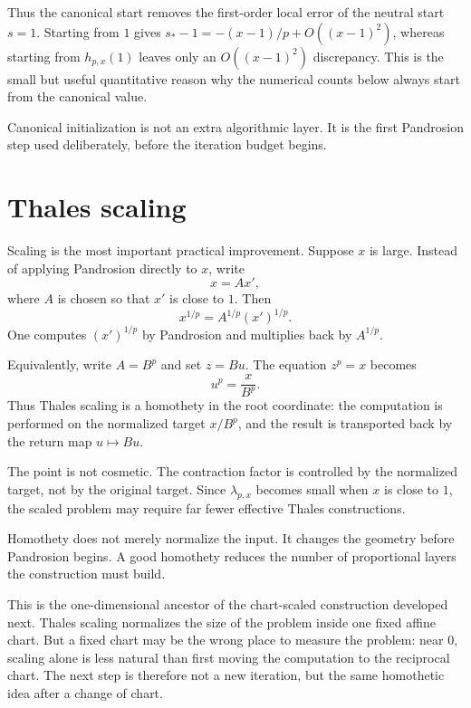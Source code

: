 \documentclass[10pt,a4paper]{article}
\theoremstyle{plain}
\theoremstyle{definition}
\theoremstyle{remark}
\newenvironment{takeaway}{%
  \begin{center}\begin{minipage}{0.92\linewidth}\small\itshape\color{blue!45!black}%
}{%
  \end{minipage}\end{center}%
}
\begin{document}
Thus the canonical start removes the first-order local error of the neutral
start $s=1$.  Starting from $1$ gives
$s_*-1=-(x-1)/p+O((x-1)^2)$, whereas starting from $h_{p,x}(1)$ leaves only an
$O((x-1)^2)$ discrepancy.  This is the small but useful quantitative reason why
the numerical counts below always start from the canonical value.

\begin{takeaway}
Canonical initialization is not an extra algorithmic layer.  It is the first
Pandrosion step used deliberately, before the iteration budget begins.
\end{takeaway}


\section{Thales scaling}
\label{sec:scaling}

Scaling is the most important practical improvement.  Suppose $x$ is large.
Instead of applying Pandrosion directly to $x$, write
\begin{equation}
  x=A x',
  \label{eq:scaling-factor}
\end{equation}
where $A$ is chosen so that $x'$ is close to $1$.  Then
\[
  x^{1/p}=A^{1/p}(x')^{1/p}.
\]
One computes $(x')^{1/p}$ by Pandrosion and multiplies back by $A^{1/p}$.

Equivalently, write $A=B^p$ and set $z=Bu$.  The equation $z^p=x$ becomes
\[
  u^p=\frac{x}{B^p}.
\]
Thus Thales scaling is a homothety in the root coordinate: the computation is
performed on the normalized target $x/B^p$, and the result is transported back
by the return map $u\mapsto Bu$.

The point is not cosmetic.  The contraction factor is controlled by the
normalized target, not by the original target.  Since $\lambda_{p,x}$ becomes
small when $x$ is close to $1$, the scaled problem may require far fewer
effective Thales constructions.

\begin{takeaway}
Homothety does not merely normalize the input.  It changes the geometry before
Pandrosion begins.  A good homothety reduces the number of proportional layers
the construction must build.
\end{takeaway}

This is the one-dimensional ancestor of the chart-scaled construction developed
next.  Thales scaling normalizes the size of the problem inside one fixed
affine chart.  But a fixed chart may be the wrong place to measure the problem:
near $0$, scaling alone is less natural than first moving the computation to
the reciprocal chart.  The next step is therefore not a new iteration, but the
same homothetic idea after a change of chart.
\end{document}
